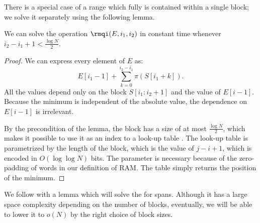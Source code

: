 There is a special case of a range which fully is contained within a single block; we solve it separately using the following lemma.
\begin{lemma}\label{lemma:rmq1}
	We can solve the operation $\rmqi(E, i_1, i_2)$ in constant time whenever $i_2 - i_1 + 1 < \frac{\log N}{2}$.
\end{lemma}
\begin{proof}
	We can express every element of $E$ as:
	$$ E[i_1 - 1] + \sum_{k = 0}^{i_2 - i_1} \pi(S[i_1 + k]). $$
	All the values depend only on the block $S[i_1 : i_2 + 1]$ and the value of $E[i - 1]$.
	Because the minimum is independent of the absolute value, the dependence on $E[i - 1]$ is irrelevant.
	
	By the precondition of the lemma, the block has a size of at most $\frac{\log N}{2}$, which makes it possible to use it as an index to a look-up table \rmqi.
	The look-up table is parametrized by the length of the block, which is the value of $j - i + 1$, which is encoded in $O(\log \log N)$ bits.
	The parameter is necessary because of the zero-padding of words in our definition of RAM.
	The table simply returns the position of the minimum.
\end{proof}

\bigbreak

We follow with a lemma which will solve the \rmqi{} for spans.
Although it has a large space complexity depending on the number of blocks, eventually, we will be able to lower it to $o(N)$ by the right choice of block sizes.

